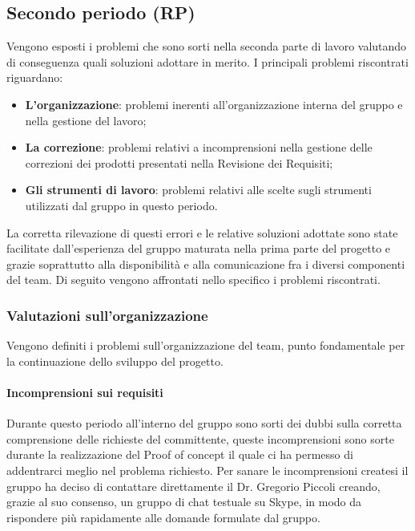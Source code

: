 \documentclass[../piano-di-qualifica.tex]{subfiles}
\begin{document}
\subsection{Secondo periodo (RP)}
Vengono esposti i problemi che sono sorti nella seconda parte di lavoro valutando di conseguenza quali soluzioni adottare in merito.
I principali problemi riscontrati riguardano:
\begin{itemize}
    \item \textbf{L'organizzazione}: problemi inerenti all'organizzazione interna del gruppo e nella gestione del lavoro;
    \item \textbf{La correzione}: problemi relativi a incomprensioni nella gestione delle correzioni dei prodotti presentati nella Revisione dei Requisiti;
    \item \textbf{Gli strumenti di lavoro}: problemi relativi alle scelte sugli strumenti utilizzati dal gruppo in questo periodo.
\end{itemize}
La corretta rilevazione di questi errori e le relative soluzioni adottate sono state facilitate dall'esperienza del gruppo maturata nella prima parte del progetto e grazie soprattutto alla disponibilità e alla comunicazione fra i diversi componenti del team.
Di seguito vengono affrontati nello specifico i problemi riscontrati.

\subsubsection{Valutazioni sull’organizzazione}
\label{sub:valutazioni_organizzazione}
Vengono definiti i problemi sull'organizzazione del team, punto fondamentale per la continuazione dello sviluppo del progetto.

\paragraph{Incomprensioni sui requisiti}
\label{sub:incomprensioni_sui_requisiti}
Durante questo periodo all'interno del gruppo sono sorti dei dubbi sulla corretta comprensione delle richieste del committente, queste incomprensioni sono sorte durante la realizzazione del Proof of concept il quale ci ha permesso di addentrarci meglio nel problema richiesto.
Per sanare le incomprensioni createsi il gruppo ha deciso di contattare direttamente il Dr. Gregorio Piccoli creando, grazie al suo consenso, un gruppo di chat testuale su Skype, in modo da rispondere più rapidamente alle domande formulate dal gruppo. 
\end{document}
